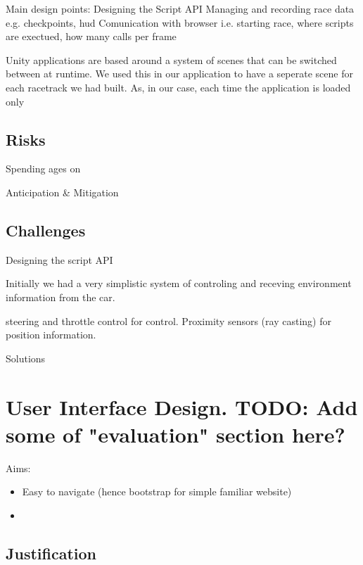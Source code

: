 Main design points:
Designing the Script API
Managing and recording race data e.g. checkpoints, hud
Comunication with browser i.e. starting race, where scripts are exectued, how many calls per frame

Unity applications are based around a system of scenes that can be switched between at runtime. We used this in our application to have a seperate scene for each racetrack we had built. As, in our case, each time the application is loaded only 

\subsection{Risks}
Spending ages on 

Anticipation \& Mitigation

\subsection{Challenges}
Designing the script API

Initially we had a very simplistic system of controling and receving environment information from the car. 

steering and throttle control for control. Proximity sensors (ray casting) for position information. 

Solutions

\section{User Interface Design. TODO: Add some of "evaluation" section here?}
Aims:
\begin{itemize}
\item Easy to navigate (hence bootstrap for simple familiar website) 
\item 
\end{itemize}



\subsection{Justification}



